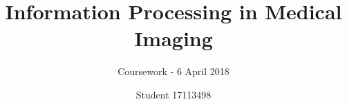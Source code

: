 \documentclass[runningheads]{llncs}
\begin{document}
%
\title{Information Processing in Medical Imaging}
\subtitle{Coursework - 6 April 2018}
%
%
\author{Student 17113498}
%
%
%
\maketitle              %







%
%
%
\clearpage


\end{document}
